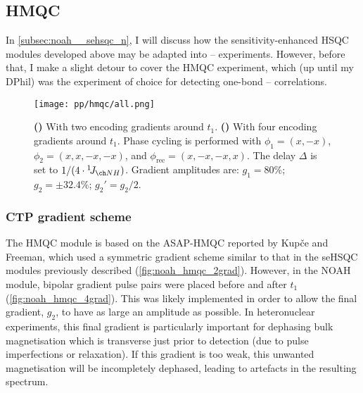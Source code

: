 \subsection{\texorpdfstring{\nitrogen{}}{15N} HMQC}
\label{subsec:noah__hmqc}

In \cref{subsec:noah__sehsqc_n}, I will discuss how the sensitivity-enhanced HSQC modules developed above may be adapted into \proton{}--\nitrogen{} experiments.
However, before that, I make a slight detour to cover the \nitrogen{} HMQC experiment, which (up until my DPhil) was the experiment of choice for detecting one-bond \proton{}--\nitrogen{} correlations.

\begin{figure}[htb]
    \centering
    \texttt{[image: pp/hmqc/all.png]}%
    {\label{fig:noah_hmqc_2grad}}%
    {\label{fig:noah_hmqc_4grad}}%
    \caption[NOAH HMQC pulse sequences]{
        \textbf{()} With two encoding gradients around $t_1$.
        \textbf{()} With four encoding gradients around $t_1$.
        Phase cycling is performed with $\phi_1 = (x, -x)$, $\phi_2 = (x, x, -x, -x)$, and $\phi_\text{rec} = (x, -x, -x, x)$.
        The delay $\Delta$ is set to $1 / (4 \cdot \oneJ{NH})$.
        Gradient amplitudes are: $g_1 = 80\%$; $g_2 = \pm 32.4\%$; $g_2' = g_2/2$.
    }
    \label{fig:noah_hmqc}
\end{figure}


\subsubsection{CTP gradient scheme}

The HMQC module is based on the ASAP-HMQC reported by Kup{\v{c}}e and Freeman\autocite{Kupce2007MRC}, which used a symmetric gradient scheme similar to that in the seHSQC modules previously described (\cref{fig:noah_hmqc_2grad}).
However, in the NOAH module\autocite{Kupce2017ACIE}, bipolar gradient pulse pairs were placed before and after $t_1$ (\cref{fig:noah_hmqc_4grad}).
This was likely implemented in order to allow the final gradient, $g_2$, to have as large an amplitude as possible.
In heteronuclear experiments, this final gradient is particularly important for dephasing bulk magnetisation which is transverse just prior to detection (due to pulse imperfections or relaxation).
If this gradient is too weak, this unwanted magnetisation will be incompletely dephased, leading to artefacts in the resulting spectrum.

